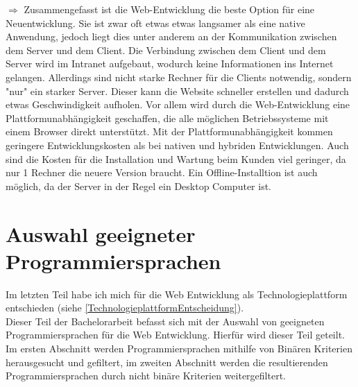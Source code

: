\documentclass[ngerman]{article}
\begin{document}
    \indent$\Rightarrow$ Zusammengefasst ist die Web-Entwicklung die beste Option für eine Neuentwicklung. Sie ist zwar oft etwas etwas langsamer als eine native Anwendung, jedoch liegt dies unter anderem an der Kommunikation zwischen dem Server und dem Client. Die Verbindung zwischen dem Client und dem Server wird im Intranet aufgebaut, wodurch keine Informationen ins Internet gelangen. Allerdings sind nicht starke Rechner für die Clients notwendig, sondern "nur" ein starker Server. Dieser kann die Website schneller erstellen und dadurch etwas Geschwindigkeit aufholen. Vor allem wird durch die Web-Entwicklung eine Plattformunabhängigkeit geschaffen, die alle möglichen Betriebssysteme mit einem Browser direkt unterstützt. Mit der Plattformunabhängigkeit kommen geringere Entwicklungskosten als bei nativen und hybriden Entwicklungen. Auch sind die Kosten für die Installation und Wartung beim Kunden viel geringer, da nur 1 Rechner die neuere Version braucht. Ein Offline-Installtion ist auch möglich, da der Server in der Regel ein Desktop Computer ist.
    \newpage\noindent
    \section{Auswahl geeigneter Programmiersprachen}
    \label{AuswahlProgrammiersprachen}
    Im letzten Teil habe ich mich für die Web Entwicklung als Technologieplattform entschieden (siehe \ref{TechnologieplattformEntscheidung}).\\
    Dieser Teil der Bachelorarbeit befasst sich mit der Auswahl von geeigneten Programmiersprachen für die Web Entwicklung. Hierfür wird dieser Teil geteilt. Im ersten Abschnitt werden Programmiersprachen mithilfe von Binären Kriterien herausgesucht und gefiltert, im zweiten Abschnitt werden die resultierenden Programmiersprachen durch nicht binäre Kriterien weitergefiltert.
\end{document}
